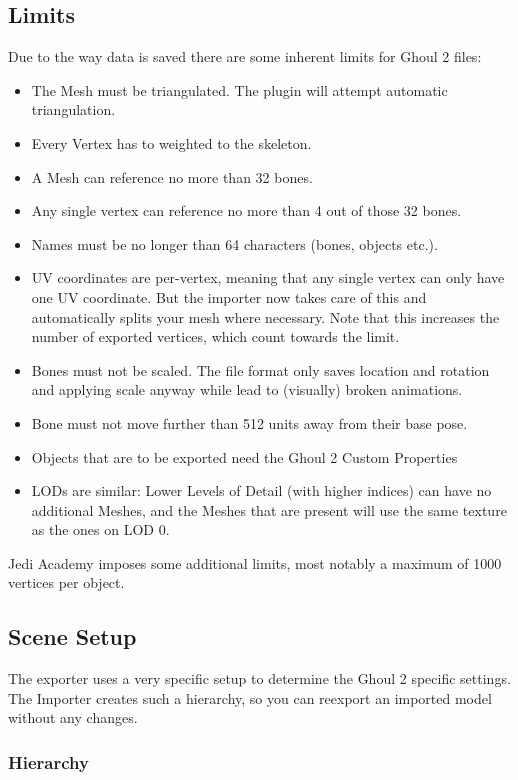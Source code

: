 \documentclass[a4paper,10pt]{article}
\begin{document}
 
 \subsection{Limits}
 
 Due to the way data is saved there are some inherent limits for Ghoul 2 files:
 \begin{itemize}
  \item The Mesh must be triangulated. The plugin will attempt automatic triangulation.
  \item Every Vertex has to weighted to the skeleton.
  \item A Mesh can reference no more than 32 bones.
  \item Any single vertex can reference no more than 4 out of those 32 bones.
  \item Names must be no longer than 64 characters (bones, objects etc.).
  \item UV coordinates are per-vertex, meaning that any single vertex can only have one UV coordinate.
  But the importer now takes care of this and automatically splits your mesh where necessary.
  Note that this increases the number of exported vertices, which count towards the limit.
  \item Bones must not be scaled. The file format only saves location and rotation and applying scale anyway
  while lead to (visually) broken animations.
  \item Bone must not move further than 512 units away from their base pose.
  \item Objects that are to be exported need the Ghoul 2 Custom Properties
  \item LODs are similar: Lower Levels of Detail (with higher indices) can have no additional Meshes, and the
  Meshes that are present will use the same texture as the ones on LOD 0.
 \end{itemize}
 Jedi Academy imposes some additional limits, most notably a maximum of 1000 vertices per object.
 
 \subsection{Scene Setup}
 
 The exporter uses a very specific setup to determine the Ghoul 2 specific settings. The Importer creates
 such a hierarchy, so you can reexport an imported model without any changes.
 
 \subsubsection{Hierarchy}
 
\end{document}
